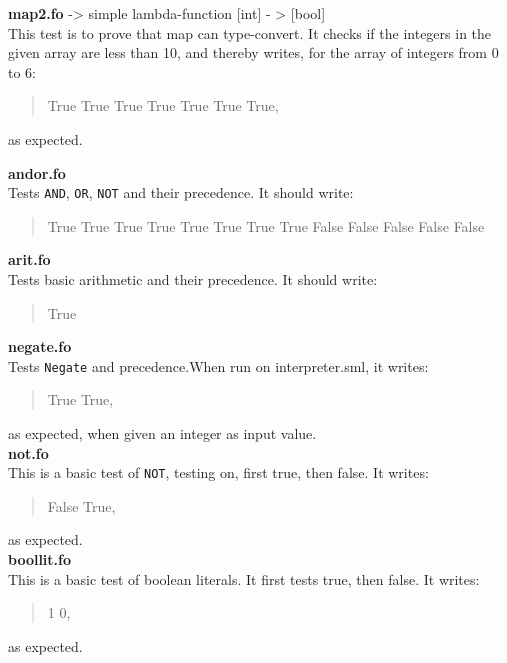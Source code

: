 \documentclass[11pt,a4paper]{article}
\theoremstyle{plain}
\theoremstyle{definition}
\theoremstyle{remark}
\numberwithin{equation}{section}
\begin{document}
	\textbf{map2.fo} -> simple lambda-function [int] - > [bool]\\
	This test is to prove that map can type-convert. It checks if the integers in the given array are less than 10, and thereby writes, for the array of integers from 0 to 6:
	\begin{quote}
		True True True True True True True,
	\end{quote}
	as expected.             
	
	\textbf{andor.fo}\\
	Tests \texttt{AND}, \texttt{OR}, \texttt{NOT} and their precedence. It should write:
	\begin{quote}
		True True True True True True True True False False False False False
	\end{quote}
	
	\textbf{arit.fo}\\
	Tests basic arithmetic and their precedence.
	It should write:
	\begin{quote}
		True
	\end{quote}
	
	\textbf{negate.fo}\\
	Tests \texttt{Negate} and precedence.When run on interpreter.sml, it writes:
	\begin{quote}
		True True,
	\end{quote}
	as expected, when given an integer as input value.\\
	
	\textbf{not.fo}\\
	This is a basic test of \texttt{NOT}, testing on, first true, then false. It writes:             
	\begin{quote}
		False True,
	\end{quote}
	as expected.\\
	
	\textbf{boollit.fo}\\
	This is a basic test of boolean literals. It first tests true, then false. It writes:             
	\begin{quote}
		1 0,
	\end{quote}
	as expected.
	
	
\end{document}
